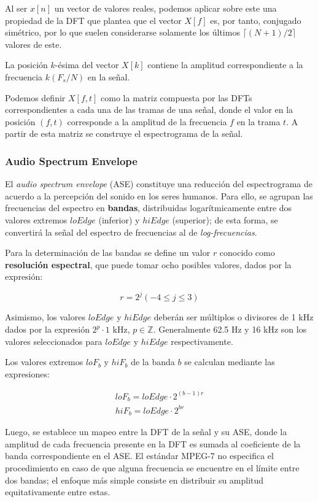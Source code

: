 Al ser $x[n]$ un vector de valores reales, podemos aplicar sobre este una propiedad de la DFT que plantea que el vector $X[f]$ es, por tanto, conjugado simétrico, por lo que suelen considerarse solamente los últimos $\lceil (N+1)/2 \rceil$ valores de este.

La posición $k$-ésima del vector $X[k]$ contiene la amplitud correspondiente a la frecuencia $k(F_s/N)$ en la señal.

Podemos definir $X[f,t]$ como la matriz compuesta por las DFTs correspondientes a cada una de las tramas de una señal, donde el valor en la posición $(f, t)$ corresponde a la amplitud de la frecuencia $f$ en la trama $t$.
A partir de esta matriz se construye el espectrograma de la señal.

\subsubsection{Audio Spectrum Envelope}

El \textit{audio spectrum envelope} (ASE) constituye una reducción del espectrograma de acuerdo a la percepción del sonido en los seres humanos.
Para ello, se agrupan las frecuencias del espectro en \textbf{bandas}, distribuidas logarítmicamente entre dos valores extremos $loEdge$ (inferior) y $hiEdge$ (superior);
de esta forma, se convertirá la señal del espectro de frecuencias al de \textit{log-frecuencias}.

Para la determinación de las bandas se define un valor $r$ conocido como \textbf{resolución espectral}, que puede tomar ocho posibles valores, dados por la expresión:

\[
    r = 2^j (-4\leq j \leq 3)
\]

Asimismo, los valores $loEdge$ y $hiEdge$ deberán ser múltiplos o divisores de 1 kHz dados por la expresión $2^p \cdot 1$ kHz, $p \in \mathbb{Z}$.
Generalmente 62.5 Hz y 16 kHz son los valores seleccionados para $loEdge$ y $hiEdge$ respectivamente.

Los valores extremos $loF_b$ y $hiF_b$ de la banda $b$ se calculan mediante las expresiones:

\begin{gather*}
    loF_b = loEdge \cdot 2^{(b-1)r} \\
    hiF_b = loEdge \cdot 2^{br}
\end{gather*}

Luego, se establece un mapeo entre la DFT de la señal y su ASE, donde la amplitud de cada frecuencia presente en la DFT es sumada al coeficiente de la banda correspondiente en el ASE\@.
El estándar MPEG-7 no especifica el procedimiento en caso de que alguna frecuencia se encuentre en el límite entre dos bandas;
el enfoque más simple consiste en distribuir su amplitud equitativamente entre estas.

